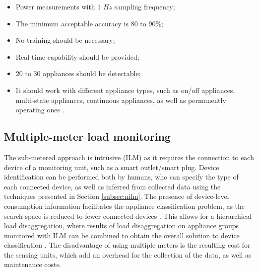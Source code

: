 \documentclass{article}
\begin{document}
\begin{itemize}
  \item Power measurements with $1$ $Hz$ sampling frequency;
  \item The minimum acceptable accuracy is $80$ to $90\%$;
  \item No training should be necessary;
  \item Real-time capability should be provided;
  \item $20$ to $30$ appliances should be detectable;
  \item It should work with different appliance types, such as on/off appliances, multi-state appliances, continuous appliances, as well as permanently operating ones \cite{Zeifman2011}.
\end{itemize}

\subsection{Multiple-meter load monitoring}
The sub-metered approach is intrusive (\ac{ILM}) as it requires the connection to each device of a monitoring unit, such as a smart outlet/smart plug.
Device identification can be performed both by humans, who can specify the type of each connected device, as well as inferred from collected data using the techniques presented in Section \ref{subsec:nilm}.
The presence of device-level consumption information facilitates the appliance classification problem, as the search space is reduced to fewer connected devices \cite{reinhardt12tracebase,Englert2013}.
This allows for a hierarchical load disaggregation, where results of load disaggregation on appliance groups monitored with \ac{ILM} can be combined to obtain the overall solution to device classification \cite{Bergman2011}.
The disadvantage of using multiple meters is the resulting cost for the sensing units, which add an overhead for the collection of the data, as well as maintenance costs.
\end{document}
